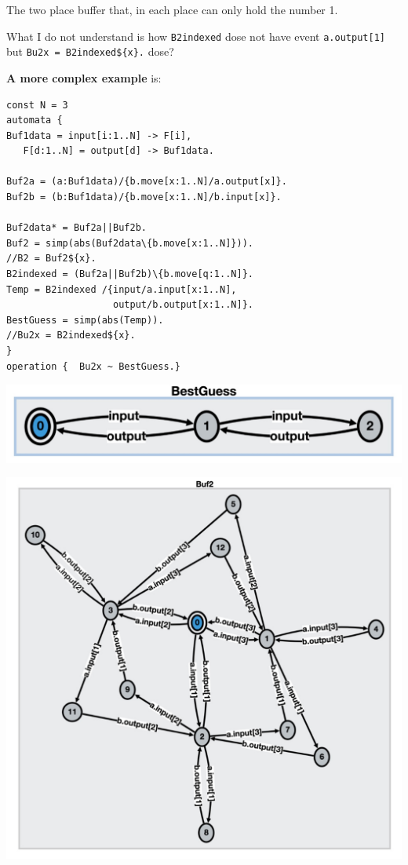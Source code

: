\documentclass[]{article}
\begin{document}
{The two place buffer that, in each place can only hold the number 1.

What I do not understand is how \verb|B2indexed| dose not have event  \verb|a.output[1]| but
\verb|Bu2x = B2indexed${x}.| dose?



{\bf A more complex example} is:

\begin{minipage}{0.55\textwidth}
\begin{verbatim}
const N = 3
automata {
Buf1data = input[i:1..N] -> F[i],
   F[d:1..N] = output[d] -> Buf1data.

Buf2a = (a:Buf1data)/{b.move[x:1..N]/a.output[x]}.
Buf2b = (b:Buf1data)/{b.move[x:1..N]/b.input[x]}.

Buf2data* = Buf2a||Buf2b.
Buf2 = simp(abs(Buf2data\{b.move[x:1..N]})).
//B2 = Buf2${x}.
B2indexed = (Buf2a||Buf2b)\{b.move[q:1..N]}.
Temp = B2indexed /{input/a.input[x:1..N],
                   output/b.output[x:1..N]}.
BestGuess = simp(abs(Temp)).
//Bu2x = B2indexed${x}.
}
operation {  Bu2x ~ BestGuess.}
   \end{verbatim}
\end{minipage}\begin{minipage}{0.4\textwidth}
\begin{center}\includegraphics[scale=0.15]{BestGuess.jpg}

\includegraphics[scale=0.17]{HideBuf2.jpg}\end{center}
\end{minipage}

}
\end{document}
